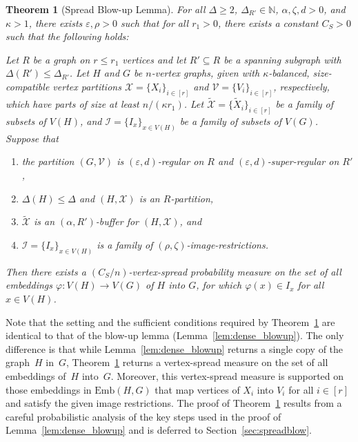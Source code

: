 \documentclass[final]{article}
\newtheorem{theorem}{Theorem}[section]
\theoremstyle{definition}
\newcommand{\itmarab}[1]{\mbox{\rm 
({\it #1}\,\arabic{*}\hspace{0.05em})}}
\newcommand{\eps}{\varepsilon}
\newcommand{\Emb}{\mathrm{Emb}}
\let\tilde\widetilde
\begin{document}
\begin{theorem}[Spread Blow-up Lemma] \label{thm:spread_dense_blowup}
  For all $\Delta\ge 2$, $\Delta_{R'} \in \mathbb{N}$, $\alpha, \zeta, d>0$, and ${\kappa>1}$, there exists $\eps, \rho > 0$ such that for all $r_1 > 0$, there exists a constant $C_S > 0$ such that the following holds: 
  
  Let $R$ be a graph on $r\le r_1$ vertices and let $R'\subseteq R$ be a spanning subgraph with $\Delta(R')\leq \Delta_{R'}$. Let $H$ and $G$ be $n$-vertex graphs, given with $\kappa$-balanced, size-compatible vertex partitions $\mathcal{X}=\{X_i\}_{i\in[r]}$ and $\mathcal{V}=\{V_i\}_{i\in[r]}$, respectively, which have parts of size at
  least $n/(\kappa r_1)$. Let 
  $\tilde{\mathcal{X}}=\{\tilde{X}_i\}_{i\in[r]}$ be a family of subsets of $V(H)$, and $\mathcal{I} = \{I_x\}_{x \in V(H)}$ be a family of subsets of $V(G)$.  
  Suppose that
  \begin{enumerate}[label=\itmarab{BL}]
  \item \label{itm:SpBL1} the partition $(G,\mathcal{V})$ is $(\eps,d)$-regular on $R$ and $(\eps,d)$-super-regular on $R'$,
  \item \label{itm:SpBL2} $\Delta(H)\leq \Delta$ and $(H,\mathcal{X})$ is an $R$-partition,
  \item \label{itm:SpBL3} $\tilde{\mathcal{X}}$ is an $(\alpha,R')$-buffer for $(H,\mathcal{X})$, and
  \item \label{itm:SpBL4} $\mathcal{I} = \{I_x\}_{x \in V(H)}$ is a family of $(\rho, \zeta)$-image-restrictions. 
  \end{enumerate}

  Then there exists a $(C_S/n)$-vertex-spread probability measure on the set of all embeddings ${\varphi: V(H) \to V(G)}$ of $H$ into $G$, for which $\varphi(x) \in I_x$ for all $x \in V(H)$.
\end{theorem}

Note that the setting and the sufficient conditions required by Theorem~\ref{thm:spread_dense_blowup} are identical to that of the blow-up lemma (Lemma~\ref{lem:dense_blowup}). The only difference is that while Lemma~\ref{lem:dense_blowup} returns a single copy of the graph~$H$ in~$G$, Theorem~\ref{thm:spread_dense_blowup} returns a vertex-spread measure on the set of all embeddings of~$H$ into~$G$. Moreover, this vertex-spread measure is supported on those embeddings in $\Emb(H, G)$ that map vertices of $X_i$ into $V_i$ for all $i \in [r]$ and satisfy the given image restrictions. The proof of Theorem~\ref{thm:spread_dense_blowup} results from a careful
probabilistic analysis of the key steps used in the proof of Lemma~\ref{lem:dense_blowup} and is deferred to Section~\ref{sec:spreadblow}.  
\end{document}
